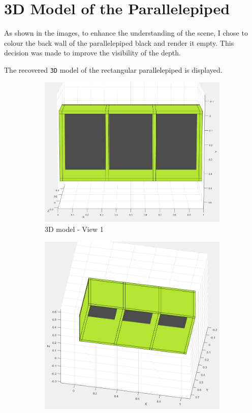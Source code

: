 \chapter{3D Model of the Parallelepiped}

As shown in the images, to enhance the understanding of the scene, I chose to colour the back wall of the parallelepiped black and render it empty. This decision was made to improve the visibility of the depth.

The recovered \verb|3D| model of the rectangular parallelepiped is displayed.

\begin{figure}[H]
     \centering
     \begin{subfigure}[b]{0.4\textwidth}
         \centering
         \includegraphics[width=\textwidth]{img/3d_1.jpg}
         \caption{3D model - View 1}
     \end{subfigure}
     \hfill
     \begin{subfigure}[b]{0.4\textwidth}
         \centering
         \includegraphics[width=\textwidth]{img/3d_3.jpg}

\end{subfigure}
\end{figure}
